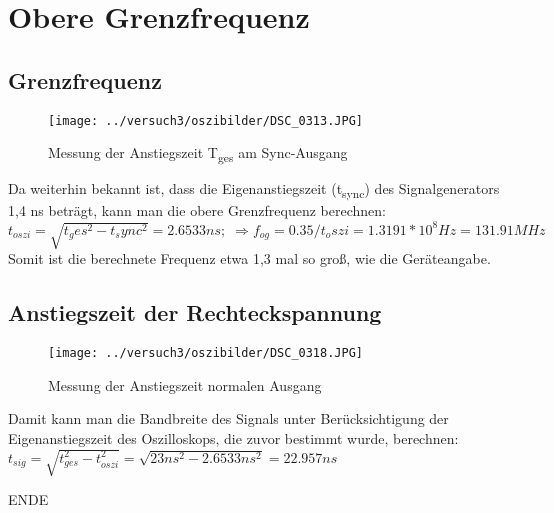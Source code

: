 \documentclass[]{beamer} %
\begin{document}
\section{Obere Grenzfrequenz}
\subsection{Grenzfrequenz}
\begin{frame}
\begin{figure}[H]
	\centering
	\texttt{[image: ../versuch3/oszibilder/DSC\_0313.JPG]}
	\caption{Messung der Anstiegszeit T\textsubscript{ges} am Sync-Ausgang}
\end{figure}
\end{frame}
\begin{frame}
Da weiterhin bekannt ist, dass die Eigenanstiegszeit (t\textsubscript{sync}) des Signalgenerators 1,4 ns beträgt, kann man die obere Grenzfrequenz berechnen:\\
$ t_{oszi} = \sqrt{t_ges^2 - t_sync^2} = 2.6533 ns; \; \Rightarrow f_{og} = 0.35/t_oszi = 1.3191*10^8 Hz = 131.91 MHz $
Somit ist die berechnete Frequenz etwa 1,3 mal so groß, wie die Geräteangabe.
\end{frame}

\subsection{Anstiegszeit der Rechteckspannung}
\begin{frame}
\begin{figure}[H]
	\centering
	\texttt{[image: ../versuch3/oszibilder/DSC\_0318.JPG]}
	\caption{Messung der Anstiegszeit normalen Ausgang}
\end{figure}
\end{frame}
\begin{frame}
Damit kann man die Bandbreite des Signals unter Berücksichtigung der Eigenanstiegszeit des Oszilloskops, die zuvor bestimmt wurde, berechnen:
$ t_{sig} = \sqrt{t_{ges}^2 - t_{oszi}^2} = \sqrt{23ns^2 - 2.6533ns^2} = 22.957ns $
\end{frame}

\begin{frame}
	\huge
	ENDE
\end{frame}
\end{document}
